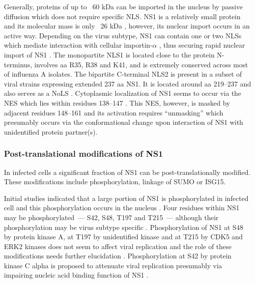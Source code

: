 		Generally, proteins of up to ~60 kDa can be imported in the nucleus by passive diffusion \parencite{Macara2001, Wang2007} which does not require specific \gls{NLS}. \gls{NS1} is a relatively small protein and its molecular mass is only ~26 kDa \parencite{Ward1994}, however, its nuclear import occurs in an active way. Depending on the virus subtype, \gls{NS1} can contain one or two \gls{NLS}s which mediate interaction with cellular importin-$\alpha$ \parencite{Melen2007}, thus securing rapid nuclear import of \gls{NS1} \parencite{Privalsky1981}. The monopartite \gls{NLS}1 is located close to the protein N-terminus, involves aa R35, R38 and K41, and is extremely conserved across most of influenza A isolates. The bipartite C-terminal NLS2 is present in a subset of viral strains expressing extended 237 aa \gls{NS1}. It is located around aa 219--237 and also serves as a \gls{NoLS} \parencite{Melen2007, Melen2012}. Cytoplasmic localization of \gls{NS1} seems to occur via the \gls{NES} which lies within residues 138--147 \parencite{Li1998}. This \gls{NES}, however, is masked by adjacent residues 148--161 and its activation requires ``unmasking'' which presumably occurs via the conformational change upon interaction of \gls{NS1} with unidentified protein partner(s). 
		
		\subsubsection{Post-translational modifications of NS1}
		
		In infected cells a significant fraction of \gls{NS1} can be post-translationally modified. These modifications include phosphorylation, linkage of \gls{SUMO} or \gls{ISG15}.
		
		Initial studies indicated that a large portion of \gls{NS1} is phosphorylated in infected cell and this phosphorylation occurs in the nucleus \parencite{Privalsky1981}. Four residues within \gls{NS1} may be phosphorylated~--- S42, S48, T197 and T215~--- although their phosphorylation may be virus subtype specific \parencite{Petri1982}. Phosphorylation of \gls{NS1} at S48 by protein kinase A, at T197 by unidentified kinase and at T215 by CDK5 and ERK2 kinases does not seem to affect viral replication and the role of these modifications needs further elucidation \parencite{Hale2009, Hutchinson2012, Hsiang2012}. Phosphorylation at S42 by protein kinase C alpha is proposed to attenuate viral replication presumably via impairing nucleic acid binding function of \gls{NS1} \parencite{Hsiang2012}.
		
